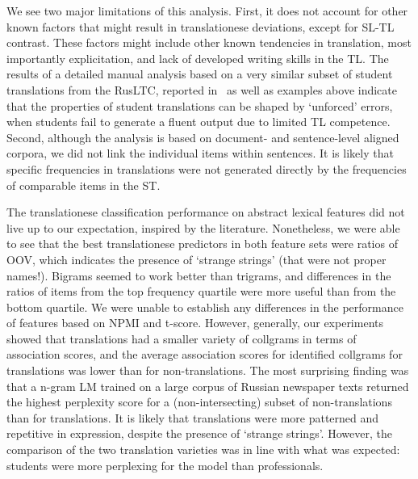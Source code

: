 We see two major limitations of this analysis. First, it does not account for other known factors that might result in translationese deviations, except for SL-TL contrast. These factors might include other known tendencies in translation, most importantly explicitation, and lack of developed writing skills in the TL. The results of a detailed manual analysis based on a very similar subset of student translations from the RusLTC, reported in~\citet{Kunilovskaya2022err} as well as examples above indicate that the properties of student translations can be shaped by `unforced' errors, when students fail to generate a fluent output due to limited TL competence.  
Second, although the analysis is based on document- and sentence-level aligned corpora, we did not link the individual items within sentences. It is likely that specific frequencies in translations were not generated directly by the frequencies of comparable items in the ST.

The translationese classification performance on abstract lexical features did not live up to our expectation, inspired by the literature. Nonetheless, we were able to see that the best translationese predictors in both feature sets were ratios of OOV, which indicates the presence of `strange strings' (that were not proper names!). Bigrams seemed to work better than trigrams, and differences in the ratios of items from the top frequency quartile were more useful than from the bottom quartile. We were unable to establish any differences in the performance of features based on NPMI and t-score. However, generally, our experiments showed that translations had a smaller variety of collgrams in terms of association scores, and the average association scores for identified collgrams for translations was lower than for non-translations.
The most surprising finding was that a n-gram LM trained on a large corpus of Russian newspaper texts returned the highest perplexity score for a (non-intersecting) subset of non-translations than for translations. It is likely that translations were more patterned and repetitive in expression, despite the presence of `strange strings'. However, the comparison of the two translation varieties was in line with what was expected: students were more perplexing for the model than professionals. 
